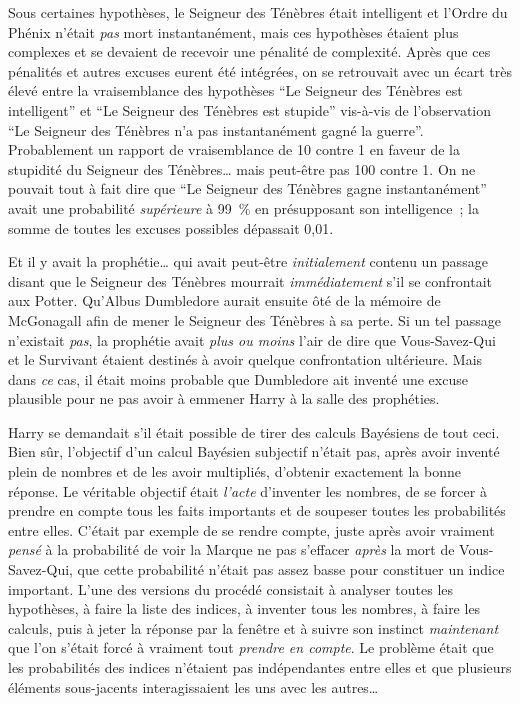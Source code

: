 Sous certaines hypothèses, le Seigneur des Ténèbres était intelligent et l'Ordre du Phénix n'était \emph{pas} mort instantanément, mais ces hypothèses étaient plus complexes et se devaient de recevoir une pénalité de complexité. Après que ces pénalités et autres excuses eurent été intégrées, on se retrouvait avec un écart très élevé entre la vraisemblance des hypothèses “Le Seigneur des Ténèbres est intelligent” et “Le Seigneur des Ténèbres est stupide” vis-à-vis de l'observation “Le Seigneur des Ténèbres n'a pas instantanément gagné la guerre”. Probablement un rapport de vraisemblance de 10 contre 1 en faveur de la stupidité du Seigneur des Ténèbres… mais peut-être pas 100 contre 1. On ne pouvait tout à fait dire que “Le Seigneur des Ténèbres gagne instantanément” avait une probabilité \emph{supérieure} à 99~\% en présupposant son intelligence~; la somme de toutes les excuses possibles dépassait 0,01.

Et il y avait la prophétie… qui avait peut-être \emph{initialement} contenu un passage disant que le Seigneur des Ténèbres mourrait \emph{immédiatement} s'il se confrontait aux Potter. Qu'Albus Dumbledore aurait ensuite ôté de la mémoire de McGonagall afin de mener le Seigneur des Ténèbres à sa perte. Si un tel passage n'existait \emph{pas}, la prophétie avait \emph{plus ou moins} l'air de dire que Vous-Savez-Qui et le Survivant étaient destinés à avoir quelque confrontation ultérieure. Mais dans \emph{ce} cas, il était moins probable que Dumbledore ait inventé une excuse plausible pour ne pas avoir à emmener Harry à la salle des prophéties.

Harry se demandait s'il était possible de tirer des calculs Bayésiens de tout ceci. Bien sûr, l'objectif d'un calcul Bayésien subjectif n'était pas, après avoir inventé plein de nombres et de les avoir multipliés, d'obtenir exactement la bonne réponse. Le véritable objectif était \emph{l'acte} d'inventer les nombres, de se forcer à prendre en compte tous les faits importants et de soupeser toutes les probabilités entre elles. C'était par exemple de se rendre compte, juste après avoir vraiment \emph{pensé} à la probabilité de voir la Marque ne pas s'effacer \emph{après} la mort de Vous-Savez-Qui, que cette probabilité n'était pas assez basse pour constituer un indice important. L'une des versions du procédé consistait à analyser toutes les hypothèses, à faire la liste des indices, à inventer tous les nombres, à faire les calculs, puis à jeter la réponse par la fenêtre et à suivre son instinct \emph{maintenant} que l'on s'était forcé à vraiment tout \emph{prendre en compte}. Le problème était que les probabilités des indices n'étaient pas indépendantes entre elles et que plusieurs éléments sous-jacents interagissaient les uns avec les autres…

